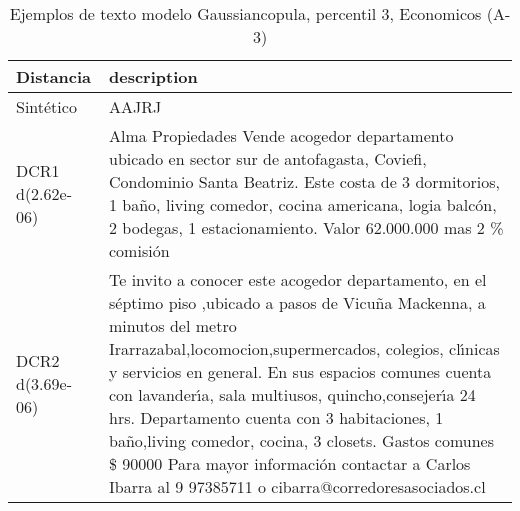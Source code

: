 \begin{table}[H]
\centering
\fontsize{10}{14}\selectfont
\caption{Ejemplos de texto modelo Gaussiancopula, percentil 3, Economicos (A-3)}
\label{table-example-economicos-a-3-gaussiancopula-3p-text}
\begin{tabular}{|l|m{35em}|}
\hline
\rowcolor[gray]{0.8}
Distancia & description \\
\hline Sintético & AAJRJ \\
\hline DCR1 d(2.62e-06) & Alma Propiedades Vende acogedor departamento ubicado en sector sur de antofagasta, Coviefi, Condominio Santa Beatriz. Este costa de 3 dormitorios, 1 ba\~no, living comedor, cocina americana, logia balc\'on, 2 bodegas, 1 estacionamiento. Valor 62.000.000 mas 2 \% comisi\'on \\
\hline DCR2 d(3.69e-06) & Te invito a conocer este acogedor departamento, en el s\'eptimo piso ,ubicado a pasos de Vicu\~na Mackenna, a minutos del metro Irarrazabal,locomocion,supermercados, colegios, cl{\'\i}nicas y servicios en general.
 En sus espacios comunes cuenta con lavander{\'\i}a, sala multiusos, quincho,consejer{\'\i}a 24 hrs. Departamento cuenta con 3 habitaciones, 1 ba\~no,living comedor, cocina, 3 closets.
 Gastos comunes \$ 90000 Para mayor informaci\'on contactar a Carlos Ibarra al 9 97385711 o cibarra@corredoresasociados.cl \\
\hline
\end{tabular}
\end{table}
